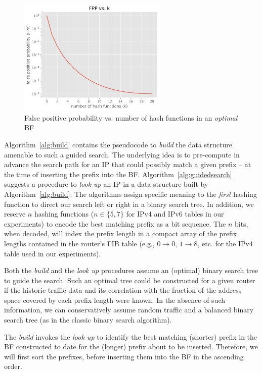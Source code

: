 \documentclass[conference,compsoc]{IEEEtran}
\begin{document}
\begin{figure}[h]
\centering
\includegraphics[height=2.2in]{../img/PvsK.png}
  \caption{False positive probability vs. number of hash functions in an \emph{optimal} BF}
\label{fig:fpp}
\end{figure}


Algorithm~\ref{alg:build} contains the pseudocode to \emph{build} the data 
structure amenable to such a guided search. The underlying idea is to
pre-compute in advance the search path for an IP that could possibly match a given
prefix -- at the time of inserting the prefix into the BF.
Algorithm~\ref{alg:guidedsearch} suggests
a procedure to \emph{look up} an IP in a data structure built by
Algorithm~\ref{alg:build}. The
algorithms assign specific meaning to the \emph{first} hashing function
to direct our search left or right in a binary search tree. In addition, we
reserve $n$ hashing functions ($n\in\{5,7\}$ for IPv4 and IPv6 tables
in our experiments) to encode
the best matching prefix as a bit sequence. The $n$ bits, when decoded,
will index the prefix length in a compact array of the prefix lengths
contained in the router's FIB table (e.g., $0 \rightarrow 0$, $1 \rightarrow 8$, etc.
for the IPv4 table used in our experiments).

Both the \emph{build} and the \emph{look up} procedures assume an (optimal)
binary search tree to guide the search. Such an optimal tree could be
constructed for a given router if the historic traffic data and its 
correlation with the fraction of the address space covered by each prefix length
were known. In the absence of such information, we can conservatively
assume random traffic and a balanced binary search tree (as in the
classic binary search algorithm).

The \emph{build} invokes the \emph{look up} to identify the
best matching (shorter) prefix in the BF constructed to date for the 
(longer) prefix
about to be inserted. Therefore, we will first sort the prefixes, before
inserting them into the BF in the ascending order.
\end{document}
